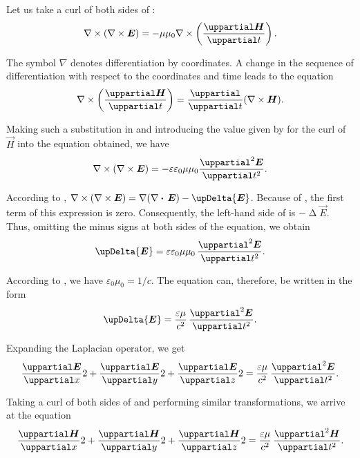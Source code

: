 Let us take a curl of both sides of :
\begin{equation}\label{eq:15_5}
    \curlop{(\curlop{\vec{E}})} = - \mu\mu_0 \curlop{\parenthesis{\diffpartial{\vec{H}}{t}}}.
\end{equation}

\noindent
The symbol $\nabla$ denotes differentiation by coordinates.
A change in the sequence of differentiation with respect to the coordinates and time leads to the equation
\begin{equation*}
    \curlop{\parenthesis{\diffpartial{\vec{H}}{t}}} = \diffpartial{}{t}(\curlop{\vec{H}}).
\end{equation*}

\noindent
Making such a substitution in  and introducing the value given by  for the curl of $\vec{H}$ into the equation obtained, we have
\begin{equation}\label{eq:15_6}
    \curlop{(\curlop{\vec{E}})} = - \varepsilon\varepsilon_0 \mu\mu_0 \diffnpartial{\vec{E}}{t}{2}.
\end{equation}

According to , $\curlop{(\curlop{\vec{E}})} = \gradop{(\divop{\vec{E}})} - \upDelta{\vec{E}}$.
Because of , the first term of this expression is zero.
Consequently, the left-hand side of  is $-\upDelta{\vec{E}}$.
Thus, omitting the minus signs at both sides of the equation, we obtain
\begin{equation*}
    \upDelta{\vec{E}} = \varepsilon\varepsilon_0 \mu\mu_0\, \diffnpartial{\vec{E}}{t}{2}.
\end{equation*}

\noindent
According to , we have $\varepsilon_0\mu_0=1/c$.
The equation can, therefore, be written in the form
\begin{equation}\label{eq:15_7}
    \upDelta{\vec{E}} = \frac{\varepsilon\mu}{c^2}\, \diffnpartial{\vec{E}}{t}{2}.
\end{equation}

\noindent
Expanding the Laplacian operator, we get
\begin{equation}\label{eq:15_8}
    \diffpartial{\vec{E}}{x}{2} + \diffpartial{\vec{E}}{y}{2} + \diffpartial{\vec{E}}{z}{2} = \frac{\varepsilon\mu}{c^2}\, \diffnpartial{\vec{E}}{t}{2}.
\end{equation}

Taking a curl of both sides of  and performing similar transformations, we arrive at the equation
\begin{equation}\label{eq:15_9}
    \diffpartial{\vec{H}}{x}{2} + \diffpartial{\vec{H}}{y}{2} + \diffpartial{\vec{H}}{z}{2} = \frac{\varepsilon\mu}{c^2}\, \diffnpartial{\vec{H}}{t}{2}.
\end{equation}

